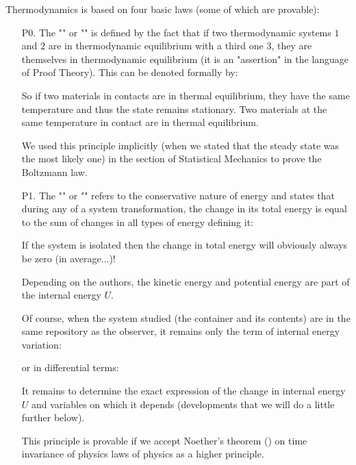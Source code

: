	Thermodynamics is based on four basic laws (some of which are provable):
	\begin{enumerate}
		\item[P0.] The "" or "" is defined by the fact that if two thermodynamic systems $1$ and $2$ are in thermodynamic equilibrium with a third one $3$, they are themselves in thermodynamic equilibrium (it is an "assertion" in the language of Proof Theory).  This can be denoted formally by:
		
		
		So if two materials in contacts are in thermal equilibrium, they have the same temperature and thus the state remains stationary. Two materials at the same temperature in contact are in thermal equilibrium.
		
		\begin{tcolorbox}[title=Remark,colframe=black,arc=10pt]
		We used this principle implicitly (when we stated that the steady state was the most likely one) in the section of Statistical Mechanics to prove the Boltzmann law.
		\end{tcolorbox}

		\item[P1.] The "" or "" refers to the conservative nature of energy and states that during any of a system transformation, the change in its total energy is equal to the sum of changes in all types of energy defining it:
		
		If the system is isolated then the change in total energy will obviously always be zero (in average...)!
		\begin{tcolorbox}[title=Remark,colframe=black,arc=10pt]
		Depending on the authors, the kinetic energy and potential energy are part of the internal energy $U$.
		\end{tcolorbox}
		Of course, when the system studied (the container and its contents) are in the same repository as the observer, it remains only the term of internal energy variation:
		
		or in differential terms:
		
		It remains to determine the exact expression of the change in internal energy $U$ and variables on which it depends (developments that we will do a little further below).
		\begin{tcolorbox}[title=Remark,colframe=black,arc=10pt]
		This principle is provable if we accept Noether's theorem () on time invariance of physics laws of physics as a higher principle.
		\end{tcolorbox}


\end{enumerate}
